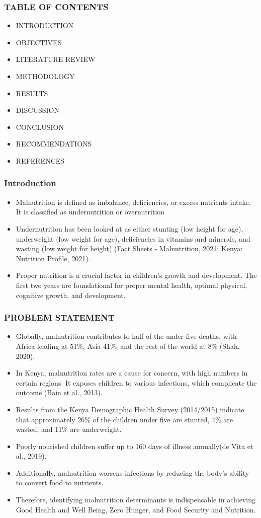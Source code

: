 	\begin{frame}
		\frametitle{TABLE OF CONTENTS}
		\begin{itemize}
			\item INTRODUCTION
			\item OBJECTIVES
			\item LITERATURE REVIEW
			\item METHODOLOGY
			\item RESULTS
			\item DISCUSSION
			\item CONCLUSION
			\item RECOMMENDATIONS
			\item REFERENCES 
		\end{itemize}
	\end{frame}
\begin{frame}
\frametitle{Introduction}
\begin{itemize}
	\item Malnutrition is defined as imbalance, deficiencies, or excess nutrients intake. It is classified as undernutrition or overnutrition
	\item Undernutrition has been looked at as either stunting (low height for age), underweight (low weight for age), deficiencies in vitamins and minerals, and wasting (low weight for height) (Fact Sheets - Malnutrition, 2021; Kenya: Nutrition Profile, 2021).
	\item Proper nutrition is a crucial factor in children’s growth and development. The first two years are foundational for proper mental health, optimal physical, cognitive growth, and development.
\end{itemize}
	\end{frame}
\begin{frame}
	\frametitle{PROBLEM STATEMENT}
	\begin{itemize}
		\item Globally, malnutrition contributes to half of the under-five deaths, with Africa leading at 51\%, Asia 41\%, and the rest of the world at 8\% (Shah, 2020).
		
		\item In Kenya, malnutrition rates are a cause for concern, with high numbers in certain regions. It exposes children to various infections, which complicate the outcome (Bain et al., 2013). 
		
		\item Results from the Kenya Demographic Health Survey (2014/2015) indicate that approximately 26\% of the children under five are stunted, 4\% are wasted, and 11\% are underweight.  
		
		\item Poorly nourished children suffer up to 160 days of illness annually(de Vita et al., 2019). 
		
		\item Additionally, malnutrition worsens infections by reducing the body’s ability to convert food to nutrients.
		
		\item Therefore, identifying malnutrition determinants is indispensable in achieving Good Health and Well Being, Zero Hunger, and Food Security and Nutrition. 
	\end{itemize}
\end{frame}
